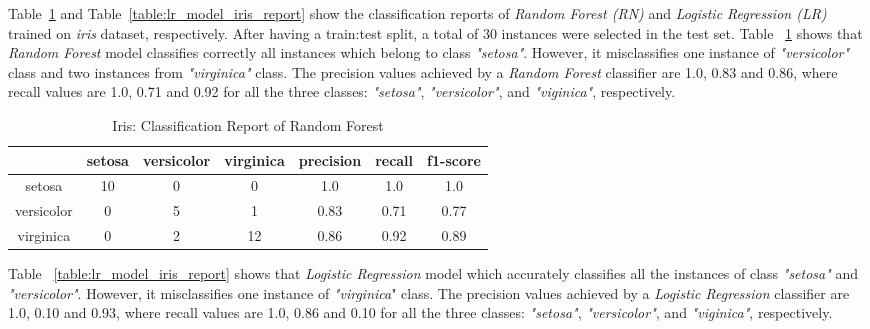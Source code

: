 \documentclass[english]{tktltiki2}
\theoremstyle{definition}
\theoremstyle{remark}
\begin{document}
Table~\ref{table:rf_model_iris_report} and Table~\ref{table:lr_model_iris_report} show the classification reports of 
\textit{Random Forest (RN)} and \textit{Logistic Regression (LR)} trained on \textit{iris} dataset, respectively. After having a train:test split, a total of 30 instances were selected in the test set. Table ~\ref{table:rf_model_iris_report} shows that \textit{Random Forest} model classifies correctly all instances which belong to class \textit{"setosa"}. However, it misclassifies one instance of \textit{"versicolor"} class and two instances from \textit{"virginica"} class. The precision values achieved by a \textit{Random Forest} classifier are 1.0, 0.83 and 0.86, where recall values are 1.0, 0.71 and 0.92 for all the three classes: \textit{"setosa"}, \textit{"versicolor"}, and \textit{"viginica"}, respectively.  


\begin{table}[H]
	\centering
	\caption{Iris: Classification Report of Random Forest}
	\label{table:rf_model_iris_report}
	\begin{tabular}{@{}ccccccc@{}}
		\toprule
		& setosa & versicolor & virginica & precision & recall & f1-score \\ \hline
		
		\multicolumn{1}{|c|}{setosa} & \multicolumn{1}{c|}{10} & \multicolumn{1}{c|}{0} & \multicolumn{1}{c|}{0} & \multicolumn{1}{c|}{1.0} & \multicolumn{1}{c|}{1.0} & \multicolumn{1}{c|}{1.0} \\ \hline
		
		\multicolumn{1}{|c|}{versicolor} & \multicolumn{1}{c|}{0} & \multicolumn{1}{c|}{5} & \multicolumn{1}{c|}{1} & \multicolumn{1}{c|}{0.83} & \multicolumn{1}{c|}{0.71} & \multicolumn{1}{c|}{0.77} \\ \hline
		
		\multicolumn{1}{|c|}{virginica} & \multicolumn{1}{c|}{0} & \multicolumn{1}{c|}{2} & \multicolumn{1}{c|}{12} & \multicolumn{1}{c|}{0.86} & \multicolumn{1}{c|}{0.92} & \multicolumn{1}{c|}{0.89} \\ \hline

	\end{tabular}
\end{table}

Table ~\ref{table:lr_model_iris_report} shows that \textit{Logistic Regression} model which accurately classifies all the instances of class \textit{"setosa"} and \textit{"versicolor"}. However, it misclassifies one instance of \textit{"virginica}" class. The precision values achieved by a \textit{Logistic Regression} classifier are 1.0, 0.10 and 0.93, where recall values are 1.0, 0.86 and 0.10 for all the three classes: \textit{"setosa"}, \textit{"versicolor"}, and \textit{"viginica"}, respectively.
\end{document}
